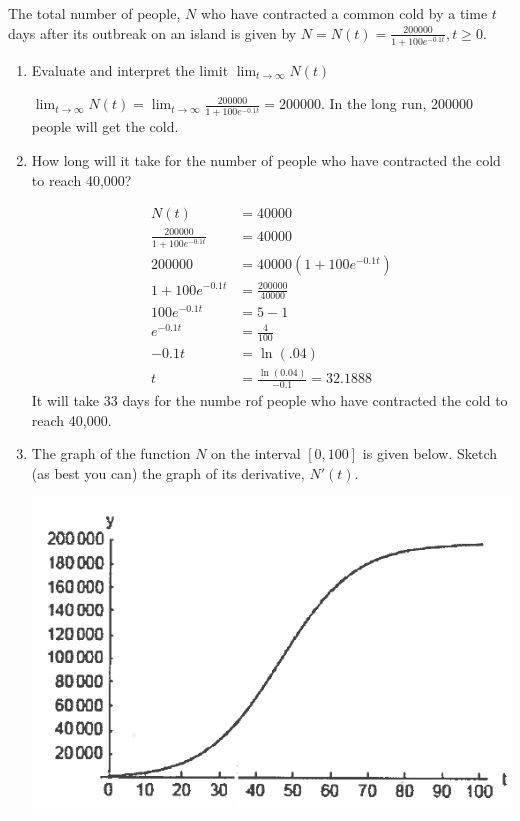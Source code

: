 \documentclass[nooutcomes]{ximera}
\begin{document}
\begin{problem}
The total number of people, $N$ who have contracted a common cold by a time $t$ days after its outbreak on an island is given by $N=N(t)= \frac{200000}{1+100e^{-0.1t}},t\geq0$.

	\begin{enumerate}
		\item Evaluate and interpret the limit $\lim_{t \to \infty} N(t)$
			\begin{freeResponse}	
			$\lim_{t \to \infty} N(t)=\lim_{t \to \infty} \frac{200000}{1+100e^{-0.1t}}=200000$.  In the long run, 200000 people will get the cold.
			\end{freeResponse}
		\item How long will it take for the number of people who have contracted the cold to reach 40,000?
			\begin{freeResponse}
				\begin{align*}
				N(t)&=40000\\
				\frac{200000}{1+100e^{-0.1t}}&=40000\\
				200000&=40000(1+100e^{-0.1t})\\
				1+100e^{-0.1t}&=\frac{200000}{40000}\\
				100e^{-0.1t}&=5-1\\
				e^{-0.1t}&=\frac{4}{100}\\
				-0.1t&=\ln(.04)\\
				t&=\frac{\ln(0.04)}{-0.1}=32.1888
				\end{align*}
			It will take 33 days for the numbe rof people who have contracted the cold to reach 40,000.
			\end{freeResponse}
		\item The graph of the function $N$ on the interval $[0,100]$ is given below.  Sketch (as best you can) the graph of its derivative, $N'(t)$.
			\begin{image}
			\includegraphics[scale=.4]{Figure8.png}

\end{image}
\end{enumerate}
\end{problem}
\end{document}
